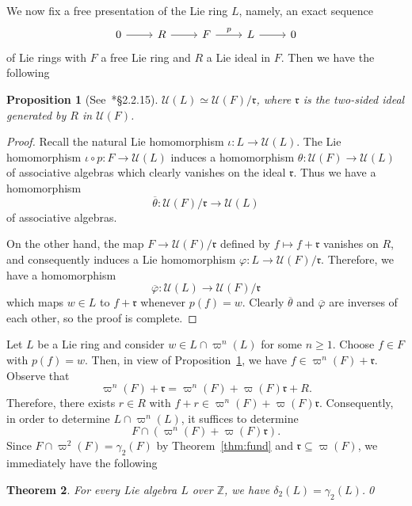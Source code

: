 \documentclass[a4paper,reqno,notitlepage]{amsart}
\newtheorem{theorem}{Theorem}[section]
\newtheorem{prop}[theorem]{Proposition}
\theoremstyle{definition}
\newcommand{\Z}{\mathbb Z}
\newcommand\rr{{\mathfrak r}}
\newcommand\U{\mathscr U}
\begin{document}
We now fix a free presentation of the Lie ring $L$, namely, an exact
sequence
\[\begin{tikzcd}0\arrow{r} & R\arrow{r} & F\arrow{r}{p} & L\arrow{r} & 0\end{tikzcd}\]
of Lie rings with $F$ a free Lie ring and $R$ a Lie ideal in $F$. Then
we have the following
\begin{prop}[See~\cite{Dixmier:77}*{\S2.2.15}]\label{prop:uni}
  $\U(L)\simeq \U(F)/\rr$, where $\rr$ is the
  two-sided ideal generated by $R$ in $\U(F)$.
\end{prop}
\begin{proof}
  Recall the natural Lie homomorphism $\iota:L\to \U(L)$. The Lie
  homomorphism $\iota\circ p: F\to \U(L)$ induces a homomorphism
  $\theta:\U(F)\to \U(L)$ of associative algebras which clearly
  vanishes on the ideal $\rr$. Thus we have a homomorphism
  \[\overline{\theta}:\U(F)/\rr\to \U(L)\]
  of associative algebras.

  On the other hand, the map $F\to \U(F)/\rr$ defined by $f\mapsto
  f+\rr$ vanishes on $R$, and consequently induces a Lie homomorphism
  $\varphi:L\to \U(F)/\rr$. Therefore, we have a homomorphism
  \[\overline{\varphi}:\U(L)\to \U(F)/\rr\]
  which maps $w\in L$ to $f+\rr$ whenever $p(f)=w$.  Clearly
  $\overline{\theta}$ and $\overline{\varphi}$ are inverses of each
  other, so the proof is complete.
\end{proof}

Let $L$ be a Lie ring and consider $w\in L\cap\varpi^n(L)$ for some
$n\geq 1$. Choose $f\in F$ with $p(f)=w$. Then, in view of
Proposition~\ref{prop:uni}, we have $f\in \varpi^n(F)+\rr$. Observe that
\[\varpi^n(F)+\rr=\varpi^n(F)+\varpi(F)\rr+R.\]
Therefore, there exists $r\in R$ with $f+r\in
\varpi^n(F)+\varpi(F)\rr$. Consequently, in order to determine $L\cap
\varpi^n(L)$, it suffices to determine
\[F \cap (\varpi^n(F)+\varpi(F)\rr).
\]
Since $F\cap \varpi^2(F)=\gamma_2(F)$ by Theorem~\ref{thm:fund} and
$\rr\subseteq \varpi(F)$, we immediately have the following
\begin{theorem}\label{case n=2}
  For every Lie algebra $L$ over $\Z$, we have
  $\delta_2(L)=\gamma_2(L)$.\qed
\end{theorem}
\end{document}
